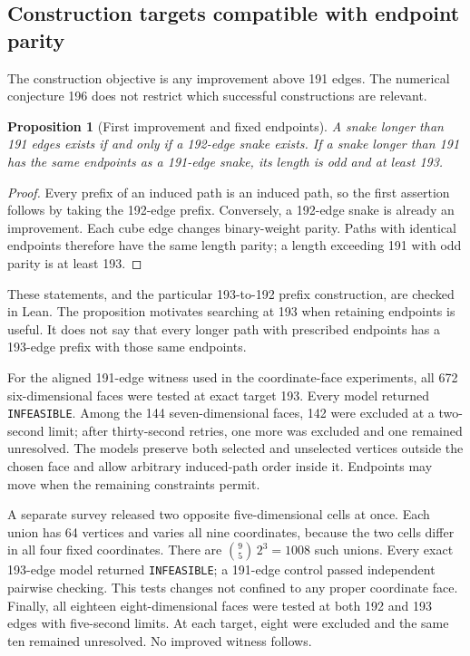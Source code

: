 \documentclass[11pt,a4paper]{article}
\newtheorem{proposition}[theorem]{Proposition}
\theoremstyle{definition}
\theoremstyle{remark}
\begin{document}
\subsection{Construction targets compatible with endpoint parity}
The construction objective is any improvement above 191 edges. The numerical conjecture 196 does not restrict which successful constructions are relevant.

\begin{proposition}[First improvement and fixed endpoints]
A snake longer than 191 edges exists if and only if a 192-edge snake exists. If a snake longer than 191 has the same endpoints as a 191-edge snake, its length is odd and at least 193.
\end{proposition}
\begin{proof}
Every prefix of an induced path is an induced path, so the first assertion follows by taking the 192-edge prefix. Conversely, a 192-edge snake is already an improvement. Each cube edge changes binary-weight parity. Paths with identical endpoints therefore have the same length parity; a length exceeding 191 with odd parity is at least 193.
\end{proof}
These statements, and the particular 193-to-192 prefix construction, are checked in Lean. The proposition motivates searching at 193 when retaining endpoints is useful. It does not say that every longer path with prescribed endpoints has a 193-edge prefix with those same endpoints.

For the aligned 191-edge witness used in the coordinate-face experiments, all 672 six-dimensional faces were tested at exact target 193. Every model returned \texttt{INFEASIBLE}. Among the 144 seven-dimensional faces, 142 were excluded at a two-second limit; after thirty-second retries, one more was excluded and one remained unresolved. The models preserve both selected and unselected vertices outside the chosen face and allow arbitrary induced-path order inside it. Endpoints may move when the remaining constraints permit.

A separate survey released two opposite five-dimensional cells at once. Each union has 64 vertices and varies all nine coordinates, because the two cells differ in all four fixed coordinates. There are $\binom95\,2^3=1008$ such unions. Every exact 193-edge model returned \texttt{INFEASIBLE}; a 191-edge control passed independent pairwise checking. This tests changes not confined to any proper coordinate face. Finally, all eighteen eight-dimensional faces were tested at both 192 and 193 edges with five-second limits. At each target, eight were excluded and the same ten remained unresolved. No improved witness follows.
\end{document}
